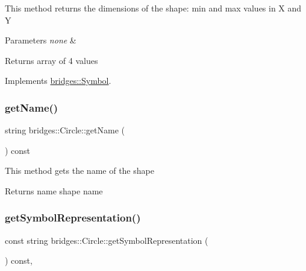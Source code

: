 This method returns the dimensions of the shape\+: min and max values in X and Y


\begin{DoxyParams}{Parameters}
{\em none} & \\
\hline
\end{DoxyParams}
\begin{DoxyReturn}{Returns}
array of 4 values 
\end{DoxyReturn}


Implements \mbox{\hyperlink{classbridges_1_1_symbol_a6eb190dc71b31b344b7610a07c6dc1d5}{bridges\+::\+Symbol}}.

\mbox{\label{classbridges_1_1_circle_ae3aba409ad5868406efa736434ada2fa}} 
\subsubsection{\texorpdfstring{get\+Name()}{getName()}}
{\footnotesize\ttfamily string bridges\+::\+Circle\+::get\+Name (\begin{DoxyParamCaption}{ }\end{DoxyParamCaption}) const\hspace{0.3cm}{\ttfamily [inline]}}

This method gets the name of the shape

\begin{DoxyReturn}{Returns}
name shape name 
\end{DoxyReturn}
\mbox{\label{classbridges_1_1_circle_aaee59a0d8ad00c75f7547bac2cfabd38}} 
\subsubsection{\texorpdfstring{get\+Symbol\+Representation()}{getSymbolRepresentation()}}
{\footnotesize\ttfamily const string bridges\+::\+Circle\+::get\+Symbol\+Representation (\begin{DoxyParamCaption}{ }\end{DoxyParamCaption}) const\hspace{0.3cm}{\ttfamily [inline]}, {\ttfamily [virtual]}}

